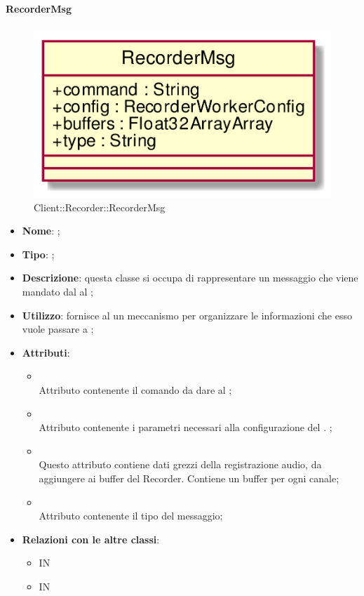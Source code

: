 \hypertarget{RecorderMsg_label}{\paragraph{RecorderMsg}}
\begin{figure}[h]
	\centering
	\includegraphics[width=\textwidth,height=\textheight,keepaspectratio]{images/ClassRecorderMsg.png}
	\caption{Client::Recorder::RecorderMsg}
\end{figure}
\begin{itemize}
	\item \textbf{Nome}: ;
	\item \textbf{Tipo}: ;
	\item \textbf{Descrizione}: questa classe si occupa di rappresentare un messaggio che viene mandato dal  al ;
	\item \textbf{Utilizzo}: fornisce al  un meccanismo per organizzare le informazioni che esso vuole passare a ;
	\item \textbf{Attributi}:
	\begin{itemize}
		\item[]  \\
		Attributo contenente il comando da dare al ;
		\item[]  \\
		Attributo contenente i parametri necessari alla configurazione del . ;
		\item[]  \\
		Questo attributo contiene dati grezzi della registrazione audio, da aggiungere ai buffer del Recorder. Contiene un buffer per ogni canale;
		\item[]  \\
		Attributo contenente il tipo del messaggio;
	\end{itemize}
	\item \textbf{Relazioni con le altre classi}:
	\begin{itemize}
		\item IN \hyperlink{RecorderWorker_label}{}
		\item IN \hyperlink{Recorder_label}{}
	\end{itemize}
\end{itemize}
\FloatBarrier

